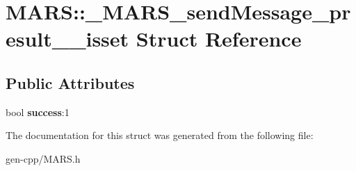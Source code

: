 \hypertarget{structMARS_1_1__MARS__sendMessage__presult____isset}{}\section{M\+A\+RS\+:\+:\+\_\+\+M\+A\+R\+S\+\_\+send\+Message\+\_\+presult\+\_\+\+\_\+isset Struct Reference}
\label{structMARS_1_1__MARS__sendMessage__presult____isset}
\subsection*{Public Attributes}
\begin{DoxyCompactItemize}
\item 
\mbox{\label{structMARS_1_1__MARS__sendMessage__presult____isset_ac2c8bef1c14c10d6416c0ce5e066bd5b}} 
bool {\bfseries success}\+:1
\end{DoxyCompactItemize}


The documentation for this struct was generated from the following file\+:\begin{DoxyCompactItemize}
\item 
gen-\/cpp/M\+A\+R\+S.\+h\end{DoxyCompactItemize}
